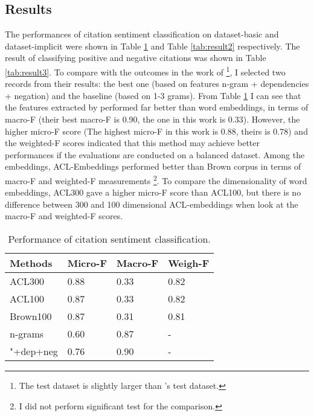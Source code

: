 \documentclass[11pt]{llncs}
\begin{document}
\subsection{Results}\label{sec:results}
The performances of citation sentiment classification on dataset-basic and dataset-implicit were shown in Table \ref{tab:result1} and Table \ref{tab:result2} respectively. The result of classifying positive and negative citations was shown in Table \ref{tab:result3}. To compare with the outcomes in the work of \cite{athar2011sentiment} \footnote{\footnotesize{The test dataset is slightly larger than \cite{athar2011sentiment}'s test dataset.}}, I selected two records from their results: the best one (based on features n-gram + dependencies + negation) and the baseline (based on 1-3 grams). From Table \ref{tab:result1} I can see that the features extracted by %
\cite{athar2011sentiment} performed far better than word embeddings, in terms of macro-F (their best macro-F is 0.90, the one in this work is 0.33). However, the higher micro-F score (The highest micro-F in this work is 0.88, theirs is 0.78) and the weighted-F scores indicated that this method may achieve better performances if the evaluations are conducted on a balanced dataset. Among the embeddings, ACL-Embeddings performed better than Brown corpus in terms of macro-F and weighted-F measurements \footnote{\footnotesize{I did not perform significant test for the comparison.}}. To compare the dimensionality of word embeddings, ACL300 gave a higher micro-F score than ACL100, but there is no difference between 300 and 100 dimensional ACL-embeddings when look at the macro-F and weighted-F scores.
\begin{table}
\centering
\small
\begin{tabular}{|p{3cm}|p{3cm}|p{3cm}|p{3cm}|}
\hline
{\bf Methods } & {\bf Micro-F} & {\bf Macro-F} & {\bf Weigh-F} \\\hline
{ACL300} & {0.88} & {0.33} & {0.82}\\
{ACL100} & {0.87} & {0.33} & {0.82}\\
{Brown100} & {0.87} & {0.31} & {0.81}\\\hline
{n-grams} & {0.60} & {0.87} & {-}\\
{"+dep+neg} & {0.76} & {0.90} & {-}\\\hline
\end{tabular}
\caption{Performance of citation sentiment classification.}\label{tab:result1}
\end{table}
\end{document}
